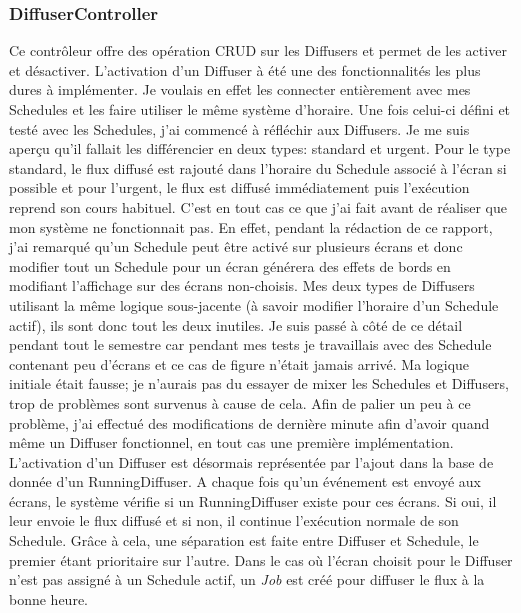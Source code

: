 \documentclass[french]{article}
\begin{document}
\subsubsection{DiffuserController}

Ce contrôleur offre des opération CRUD sur les Diffusers et permet de les activer et désactiver. \newline
L'activation d'un Diffuser à été une des fonctionnalités les plus dures à implémenter. Je voulais en effet les connecter entièrement avec mes Schedules et les faire utiliser le même système d'horaire. Une fois celui-ci défini et testé avec les Schedules, j'ai commencé à réfléchir aux Diffusers. Je me suis aperçu qu'il fallait les différencier en deux types: standard et urgent. Pour le type standard, le flux diffusé est rajouté dans l'horaire du Schedule associé à l'écran si possible et pour l'urgent, le flux est diffusé immédiatement puis l'exécution reprend son cours habituel. \newline
C'est en tout cas ce que j'ai fait avant de réaliser que mon système ne fonctionnait pas. En effet, pendant la rédaction de ce rapport, j'ai remarqué qu'un Schedule peut être activé sur plusieurs écrans et donc modifier tout un Schedule pour un écran générera des effets de bords en modifiant l'affichage sur des écrans non-choisis. Mes deux types de Diffusers utilisant la même logique sous-jacente (à savoir modifier l'horaire d'un Schedule actif), ils sont donc tout les deux inutiles. Je suis passé à côté de ce détail pendant tout le semestre car pendant mes tests je travaillais avec des Schedule contenant peu d'écrans et ce cas de figure n'était jamais arrivé.\newline
Ma logique initiale était fausse; je n'aurais pas du essayer de mixer les Schedules et Diffusers, trop de problèmes sont survenus à cause de cela. Afin de palier un peu à ce problème, j'ai effectué des modifications de dernière minute afin d'avoir quand même un Diffuser fonctionnel, en tout cas une première implémentation. \newline
L'activation d'un Diffuser est désormais représentée par l'ajout dans la base de donnée d'un RunningDiffuser. A chaque fois qu'un événement est envoyé aux écrans, le système vérifie si un RunningDiffuser existe pour ces écrans. Si oui, il leur envoie le flux diffusé et si non, il continue l'exécution normale de son Schedule. Grâce à cela, une séparation est faite entre Diffuser et Schedule, le premier étant prioritaire sur l'autre. Dans le cas où l'écran choisit pour le Diffuser n'est pas assigné à un Schedule actif, un \textit{Job} est créé pour diffuser le flux à la bonne heure.
\end{document}
